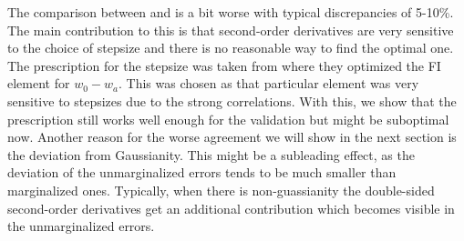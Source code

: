 \documentclass[../main.tex]{subfiles}
\begin{document}
The comparison between \montepython and \cosmicfish is a bit worse with typical discrepancies of 5-10\%. The main contribution to this is that second-order derivatives are very sensitive to the choice of stepsize and there is no reasonable way to find the optimal one. The prescription for the stepsize was taken from \cite{casas2023euclid} where they optimized the FI element for $w_0-w_a$. This was chosen as that particular element was very sensitive to stepsizes due to the strong correlations. With this, we show that the prescription still works well enough for the validation but might be suboptimal now. Another reason for the worse agreement we will show in the next section is the deviation from Gaussianity. This might be a subleading effect, as the deviation of the unmarginalized errors tends to be much smaller than marginalized ones. Typically, when there is non-guassianity the double-sided second-order derivatives get an additional contribution which becomes visible in the unmarginalized errors.
\end{document}

